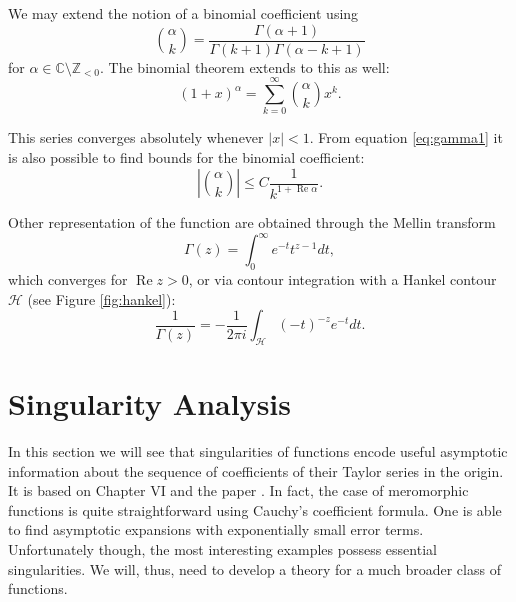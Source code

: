 We may extend the notion of a binomial coefficient using
\[
    \binom{\alpha}{k} = \frac{\Gamma(\alpha + 1)}{\Gamma(k+1) \Gamma(\alpha - k + 1)}
\]
for $\alpha \in \mathbb{C} \setminus \mathbb{Z}_{< 0}$. The binomial theorem extends to this as well:
\begin{equation}
\label{eq:binomthm}
    (1+x)^\alpha = \sum_{k = 0}^\infty \binom{\alpha}{k} x^k.
\end{equation}

This series converges absolutely whenever $|x| < 1$.
From equation \eqref{eq:gamma1} it is also possible to find bounds for the binomial coefficient:
\begin{equation}
\label{eq:binomapprox}
    \left| \binom{\alpha}{k} \right| \leq C \frac{1}{k^{1 + \operatorname{Re} \alpha}}.
\end{equation}

Other representation of the function are obtained through the Mellin transform
\begin{equation}
\label{eq:gamma2}
    \Gamma(z) = \int_0^\infty e^{-t} t^{z-1} dt,
\end{equation}
which converges for $\operatorname{Re} z > 0$, or via contour integration with a Hankel contour $\mathcal{H}$ (see Figure \ref{fig:hankel}):
\begin{equation}
\label{eq:hankelgamma}
    \frac{1}{\Gamma(z)} = -\frac{1}{2 \pi i} \int_\mathcal{H} (-t)^{-z} e^{-t} dt.
\end{equation}
    









\section{Singularity Analysis}
\label{section:singularityanalysis}

\noindent In this section we will see that singularities of functions encode useful asymptotic information about the sequence of coefficients of their Taylor series in the origin. It is based on \cite{analyticcombinatorics} Chapter VI and the paper \cite{singularityanalysis}.
In fact, the case of meromorphic functions is quite straightforward using Cauchy's coefficient formula. One is able to find asymptotic expansions with exponentially small error terms. 
Unfortunately though, the most interesting examples possess essential singularities. 
We will, thus, need to develop a theory for a much broader class of functions.


